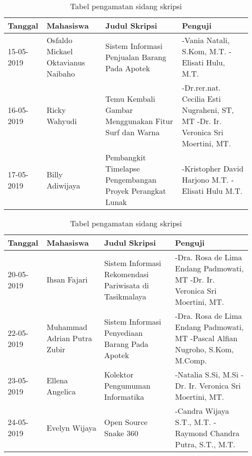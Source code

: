 \begin{table}[H]
	\caption {Tabel pengamatan sidang skripsi} \label{tab:pengamatan_sidang}
	\begin{center}
		\begin{tabular}{|p{2 cm}|>{\raggedright} p{3.5 cm}| p{4.5 cm}| p{4.5 cm}|}
		\hline
		Tanggal & Mahasiswa & Judul Skripsi & Penguji \\ 
		\hline
		15-05-2019 & Osfaldo Mickael Oktavianus Naibaho & Sistem Informasi Penjualan Barang Pada Apotek & -Vania Natali, S.Kom, M.T. \newline -Elisati Hulu, M.T. \newline \\ 
		\hline
		16-05-2019 & Ricky Wahyudi & Temu Kembali Gambar Menggunakan Fitur Surf dan Warna & -Dr.rer.nat. Cecilia Esti Nugraheni, ST, MT \newline -Dr. Ir. Veronica Sri Moertini, MT. \newline \\ 
		\hline 
		17-05-2019 & Billy Adiwijaya & Pembangkit Timelapse Pengembangan Proyek Perangkat Lunak & -Kristopher David Harjono M.T. \newline -Elisati Hulu M.T. \newline \\ 
		\hline 
		\end{tabular}
	\end{center}
\end{table}

\begin{table}[H]
	\caption {Tabel pengamatan sidang skripsi} \label{tab:pengamatan_sidang}
	\begin{center}
		\begin{tabular}{|p{2 cm}|>{\raggedright} p{3.5 cm}| p{4.5 cm}| p{4.5 cm}|}
		\hline
		Tanggal & Mahasiswa & Judul Skripsi & Penguji \\ 
		\hline
		20-05-2019 & Ihsan Fajari & Sistem Informasi Rekomendasi Pariwisata di Tasikmalaya & -Dra. Rosa de Lima Endang Padmowati, MT \newline -Dr. Ir. Veronica Sri Moertini, MT. \newline \\ 
		\hline 
		22-05-2019 & Muhammad Adrian Putra Zubir & Sistem Informasi Penyediaan Barang Pada Apotek & -Dra. Rosa de Lima Endang Padmowati, MT \newline -Pascal Alfian Nugroho, S.Kom, M.Comp. \newline \\ 
		\hline 
		23-05-2019 & Ellena Angelica & Kolektor Pengumuman Informatika & -Natalia S.Si, M.Si \newline -Dr. Ir. Veronica Sri Moertini, MT. \newline \\ 
		\hline 
		24-05-2019 & Evelyn Wijaya & Open Source Snake 360 & -Candra Wijaya S.T., M.T. \newline -Raymond Chandra Putra, S.T., M.T. \newline \\ 
		\hline 
		\end{tabular}
	\end{center}
\end{table}

